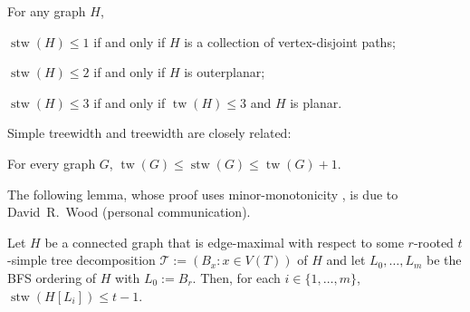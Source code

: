 \documentclass[kpfonts]{patmorin}
\DeclareMathOperator{\tw}{tw}
\DeclareMathOperator{\stw}{stw}
\theoremstyle{named}
\begin{document}
\begin{lem}\label{simple-small-cases}
    For any graph $H$,
    \begin{compactenum}[(i)]
        \item $\stw(H)\le 1$ if and only if $H$ is a collection of vertex-disjoint paths;
        \item $\stw(H)\le 2$ if and only if $H$ is outerplanar;
        \item $\stw(H)\le 3$ if and only if $\tw(H)\le 3$ and $H$ is planar.
    \end{compactenum}
\end{lem}

Simple treewidth and treewidth are closely related:

\begin{lem}\label{simple-treewidth-vs-treewidth}
    For every graph $G$, $\tw(G)\le \stw(G)\le \tw(G)+1$.
\end{lem}

%

The following lemma, whose proof uses minor-monotonicity \cite[Theorem~5.2]{wulf:stacked}, is due to David\ R.\ Wood (personal communication).

\begin{lem}\label{simple-bfs-layers}
    Let $H$ be a connected graph that is edge-maximal with respect to some $r$-rooted $t$-simple tree decomposition $\mathcal{T}:=(B_x:x\in V(T))$ of $H$ and let $L_0,\ldots,L_m$ be the BFS ordering of $H$ with $L_0:=B_r$.   Then, for each $i\in\{1,\ldots,m\}$, $\stw(H[L_i])\le t-1$.
\end{lem}
\end{document}
